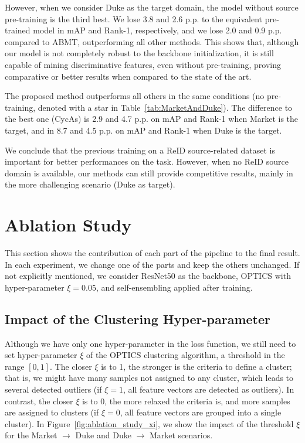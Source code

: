 \documentclass[journal]{IEEEtran}
\begin{document}
However, when we consider Duke as the target domain, the model without source pre-training is the third best. We lose 3.8 and 2.6 p.p. to the equivalent pre-trained model in mAP and Rank-1, respectively, and we lose 2.0 and 0.9 p.p. compared to ABMT, outperforming all other methods. This shows that, although our model is not completely robust to the backbone initialization, it is still capable of mining discriminative features, even without pre-training, proving comparative or better results when compared to the state of the art.

The proposed method outperforms all others in the same conditions (no pre-training, denoted with a star in Table~\ref{tab:MarketAndDuke}). The difference to the best one (CycAs) is 2.9 and 4.7 p.p. on mAP and Rank-1 when Market is the target, and in 8.7 and 4.5 p.p. on mAP and Rank-1 when Duke is the target. 

We conclude that the previous training on a ReID source-related dataset is important for better performances on the task. However, when no ReID source domain is available, our methods can still provide competitive results, mainly in the more challenging scenario (Duke as target). 





\section{Ablation Study}
\label{sec:ablation_study}
This section shows the contribution of each part of the pipeline to the final result. In each experiment, we change one of the parts and keep the others unchanged. If not explicitly mentioned, we consider ResNet50 as the backbone, OPTICS with hyper-parameter $ \xi = 0.05 $, and self-ensembling applied after training.  

\subsection{Impact of the Clustering Hyper-parameter}
\label{subsec:impact_of_xi}

Although we have only one hyper-parameter in the loss function, we still need to set hyper-parameter $ \xi $  of the OPTICS clustering algorithm, a threshold in the range $[0,1]$. The closer $ \xi $ is to 1, the stronger is the criteria to define a cluster; that is, we might have many samples not assigned to any cluster, which leads to several detected outliers (if $ \xi = 1$, all feature vectors are detected as outliers). In contrast, the closer $ \xi $ is to 0, the more relaxed the criteria is, and more samples are assigned to clusters (if $ \xi = 0 $, all feature vectors are grouped into a single cluster). In Figure~\ref{fig:ablation_study_xi}, we show the impact of the threshold $ \xi $ for the Market $ \rightarrow $ Duke and Duke $ \rightarrow $ Market scenarios.
\end{document}
